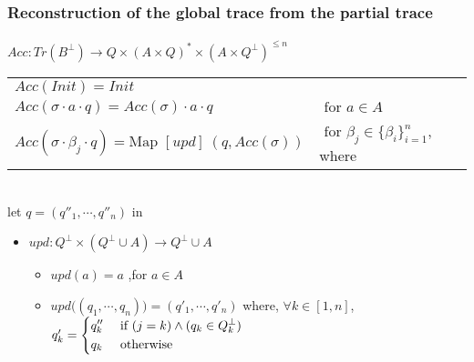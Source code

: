 \documentclass{beamer}
\begin{document}
\begin{frame}
\frametitle{Reconstruction of the global trace from the partial trace}
 \framesubtitle{}
 
 \begin{definition}
\scriptsize
$Acc:Tr(B^\perp)\longrightarrow Q\times(A\times Q)^*\times (A\times Q^\perp)^{\leq n}$


\begin{tabular}{@{-- }ll}
  $Acc(Init)=Init$\\
  $Acc(\sigma\cdot a\cdot q)=Acc(\sigma)\cdot a\cdot q$ &$\text{ for }a\in A$\\
  $Acc(\sigma\cdot\beta_j\cdot q)=\text{Map } [upd] \ (q,Acc(\sigma)) $&$\text{ for } \beta_j\in \{\beta_i\}^n_{i=1}$, where 
\end{tabular}\\

let $q=(q''_1,\cdots,q''_n)$ in 
\begin{itemize}
\scriptsize
\item[] $upd:Q^\perp\times(Q^\perp\cup A)\longrightarrow Q^\perp\cup A $
\begin{itemize}
\scriptsize
\item $upd(a)=a$ ,for $a\in A$
\item $upd\bigg((q_1,\cdots ,q_n)\bigg)=(q'_1,\cdots ,q'_n)$ where, $\forall k\in [1,n]$,\\
$q'_k=\begin{dcases}
   q''_k  &\text{ if } (j=k) \wedge (q_k\in Q^\perp_k) \\
   q_k &\text{ otherwise } \\
   \end{dcases}$


    \end{itemize}
  
\end{itemize}


\end{definition}

\end{frame}

\end{document}
